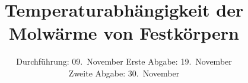 ﻿

\subject{Fortgeschrittenen Praktikum WS 15/16 - V47}
\title{Temperaturabhängigkeit der Molwärme von
Festkörpern}

\date{
	Durchführung: 09.~November 
	Erste Abgabe: 19.~November\\
	Zweite Abgabe: 30.~November
}



\maketitle
\thispagestyle{empty}
\tableofcontents
\newpage






\nocite{uncertainties}
\nocite{numpy}
\nocite{scipy}
\nocite{matplotlib}
\printbibliography[heading=head]

